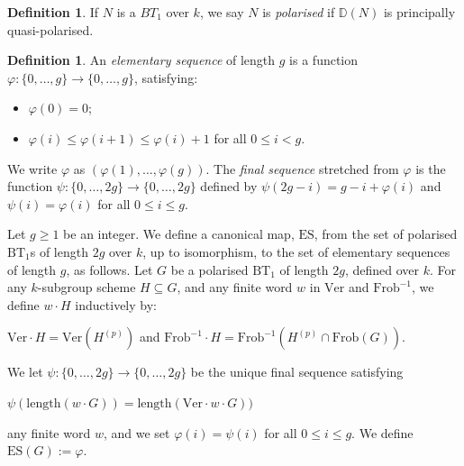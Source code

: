 \documentclass[11pt,table]{amsart}
\numberwithin{equation}{section}
\theoremstyle{definition}
\newtheorem{defn}[thm]{Definition}
\theoremstyle{remark}
\theoremstyle{remark}
\begin{document}
\begin{defn}
If $N$ is a $BT_1$ over $k$, we say $N$ is \textit{polarised} if $\mathbb{D}(N)$ is principally quasi-polarised. 

\end{defn}
\begin{defn} \label{esdefn}
 An \textit{elementary sequence} of length $g$ is a function  $\varphi : \lbrace 0 , \ldots, g \rbrace \longrightarrow \{ 0, \ldots, g\}$, satisfying: 
\begin{itemize}
    \item[(i)] $\varphi \left( 0 \right) = 0$;
    \item[(ii).] $\varphi \left( i \right) \le \varphi \left( i +1 \right) \leq \varphi \left( i \right) +1$ for all $0 \le i < g$.
\end{itemize}
We write  $\varphi$ as $(\varphi(1), \ldots, \varphi(g))$. The \textit{final sequence} stretched from $\varphi$ is the function $\psi : \{ 0, \ldots, 2g \} \rightarrow \{ 0, \ldots, 2g \}$ defined by $ \psi(2g -i) = g -i + \varphi(i)$ and $ \psi(i) = \varphi(i)$ for all $ 0 \le i \le g$.\end{defn}
Let $g \ge 1$ be an integer. We define a canonical map, $\text{ES}$, from the set of polarised $\text{BT}_{1}$s of length $2g$ over $k$, up to isomorphism, to the set of elementary sequences of length $g$, as follows. 
Let $G$ be a polarised $\text{BT}_{1}$ of length $2g$, defined over $k$. For any $k$-subgroup scheme $H \subseteq G$, and any finite word $w$ in $\mathrm{Ver}$ and $\mathrm{Frob}^{-1}$, we define $w \cdot H$ inductively by:
\begin{center}
    $\mathrm{Ver} \cdot H = \mathrm{Ver} ( H^{(p)}) $ and $ \mathrm{Frob}^{-1} \cdot H = \mathrm{Frob}^{-1}( H^{(p)} \cap \mathrm{Frob}(G))$.
\end{center}
We let $\psi : \{ 0, \ldots, 2g \} \rightarrow \{ 0, \ldots, 2g \}$ be the unique final sequence satisfying
\begin{center}
    $ \psi( \text{length}(w \cdot G)) = \text{length}( \mathrm{Ver} \cdot w \cdot G))$
\end{center}
any finite  word  $w$, and we set $\varphi(i) = \psi (i) $ for all $0 \le i \le g$. We define $\text{ES}(G) := \varphi $.
\end{document}
